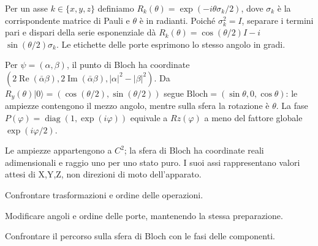 Per un asse \(k\in \{x,\allowbreak y,\allowbreak z\}\) definiamo \(R_{k}(\theta )=\allowbreak\exp (- i\theta \sigma _{k}/2)\), dove \(\sigma _{k}\) è la corrispondente matrice di Pauli e \(\theta \) è in radianti. Poiché \(\sigma _{k}^{2}=I\), separare i termini pari e dispari della serie esponenziale dà \(R_{k}(\theta )=\cos (\theta /2)I- i\) \(\sin (\theta /2)\sigma _{k}\). Le etichette delle porte esprimono lo stesso angolo in gradi.\par

Per \(\psi =(\alpha ,\allowbreak \beta )\), il punto di Bloch ha coordinate \((2\operatorname{Re}(\bar{\alpha }\beta ),\allowbreak 2\operatorname{Im}(\bar{\alpha }\beta ),\allowbreak |\alpha |^{2}- |\beta |^{2})\). Da \(R_{y}(\theta )|0\rangle =(\cos (\theta /2),\allowbreak \sin (\theta /2))\) segue \(\text{Bloch}=(\sin \theta ,\allowbreak 0,\allowbreak \cos \theta )\): le ampiezze contengono il mezzo angolo, mentre sulla sfera la rotazione è \(\theta \). La fase \(P(\varphi )=\operatorname{diag}(1,\allowbreak \allowbreak\exp (i\varphi ))\) equivale a \(Rz(\varphi )\) a meno del fattore globale \(\allowbreak\exp (i\varphi /2)\).\par



Le ampiezze appartengono a \(C^{2}\); la sfera di Bloch ha coordinate reali adimensionali e raggio uno per uno stato puro. I suoi assi rappresentano valori attesi di X,Y,Z, non direzioni di moto dell'apparato.\par



Confrontare trasformazioni e ordine delle operazioni.\par

Modificare angoli e ordine delle porte, mantenendo la stessa preparazione.\par

Confrontare il percorso sulla sfera di Bloch con le fasi delle componenti.\par

